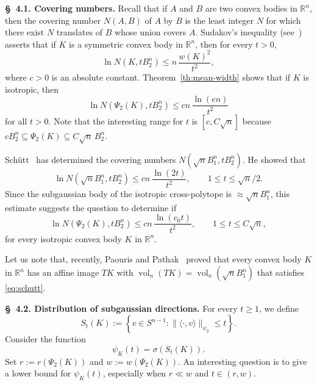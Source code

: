 \documentclass[11pt,leqno]{article}
\theoremstyle{definition}
\numberwithin{equation}{section}
\newcommand{\ls}{\leqslant}
\newcommand{\gr}{\geqslant}
\begin{document}
\noindent \textbf{\S~4.1. Covering numbers.} Recall that if $A$ and $B$ are two convex bodies in $\mathbb{R}^n$, then the covering number $N(A,B)$ of $A$ by $B$ 
is the least integer $N$ for which there exist $N$ translates of $B$ whose union covers $A$. Sudakov's inequality (see~\cite[Chapter~4]{AGA-book}) asserts that 
if $K$ is a symmetric convex body in $\mathbb{R}^n$, then for every $t>0$,
\begin{equation*}\ln N(K,tB_2^n) \ls n\,\frac{w(K)^2}{t^2},\end{equation*}
where $c>0$ is an absolute constant. Theorem~\ref{th:mean-width} shows that if $K$ is isotropic, then
\begin{equation*}\ln N(\Psi_2(K),tB_2^n)\ls c n\,\frac{\ln(en)}{t^2}\end{equation*}
for all $t>0$. Note that the interesting range for $t$ is $[c,C\sqrt{n}]$ because
$cB_2^n \subseteq \Psi_2(K) \subseteq C\sqrt{n}\,B_2^n$. 

Sch\"utt~\cite{Schutt-1984} has determined the covering numbers $N(\sqrt{n}B_1^n,tB_2^n)$. He showed that
\begin{equation}\label{eq:schutt}\ln N(\sqrt{n}B_1^n,tB_2^n)\ls cn\,\frac{\ln(2t)}{t^2},\qquad 1\ls t\ls \sqrt{n}/2.
\end{equation}
Since the subgaussian body of the isotropic cross-polytope is $\approx\sqrt{n}B_1^n$, this estimate suggests the question to determine if
\begin{equation}\label{eq:optimal-covering}\ln N(\Psi_2(K),tB_2^n)\ls  cn\,\frac{\ln(c_0t)}{t^2},\qquad 1\ls t\ls C\sqrt{n},\end{equation}
for every isotropic convex body $K$ in $\mathbb{R}^n$.

Let us note that, recently, Paouris and Pathak~\cite{Paouris-Pathak-2026} proved that every convex body $K$ in $\mathbb{R}^n$ has an affine image $TK$ with
$\operatorname{vol}_n(TK)=\operatorname{vol}_n(\sqrt{n}B_1^n)$ that satisfies \eqref{eq:schutt}.

\medskip

\noindent \textbf{\S~4.2. Distribution of subgaussian directions.} For every $t\gr  1$, we define
$$S_t(K):= \left\{v\in S^{n-1}:\|\langle\cdot,v\rangle\|_{\psi_2}\ls  t\right\}.$$ Consider the function
$$\psi_K(t)=\sigma(S_t(K)).$$
Set $r:=r(\Psi_2(K))$ and $w:=w(\Psi_2(K))$. An interesting question is to give a lower bound for $\psi_K(t)$, especially when $r\ll w$  
and $t\in(r,w)$.
\end{document}
